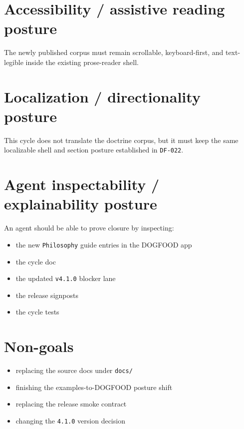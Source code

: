 \section{Accessibility / assistive reading posture}\label{record-085-accessibility-assistive-reading-posture}

The newly published corpus must remain scrollable, keyboard-first, and text-legible inside the existing prose-reader shell.

\section{Localization / directionality posture}\label{record-085-localization-directionality-posture}

This cycle does not translate the doctrine corpus, but it must keep the same localizable shell and section posture established in \texttt{D\allowbreak{}F\allowbreak{}-\allowbreak{}0\allowbreak{}2\allowbreak{}2}.

\section{Agent inspectability / explainability posture}\label{record-085-agent-inspectability-explainability-posture}

An agent should be able to prove closure by inspecting:

\begin{itemize}
\tightlist
\item
  the new \texttt{P\allowbreak{}h\allowbreak{}i\allowbreak{}l\allowbreak{}o\allowbreak{}s\allowbreak{}o\allowbreak{}p\allowbreak{}h\allowbreak{}y} guide entries in the DOGFOOD app
\item
  the cycle doc
\item
  the updated \texttt{v\allowbreak{}4\allowbreak{}.\allowbreak{}1\allowbreak{}.\allowbreak{}0} blocker lane
\item
  the release signposts
\item
  the cycle tests
\end{itemize}

\section{Non-goals}\label{record-085-non-goals}

\begin{itemize}
\tightlist
\item
  replacing the source docs under \texttt{d\allowbreak{}o\allowbreak{}c\allowbreak{}s\allowbreak{}/}
\item
  finishing the examples-to-DOGFOOD posture shift
\item
  replacing the release smoke contract
\item
  changing the \texttt{4\allowbreak{}.\allowbreak{}1\allowbreak{}.\allowbreak{}0} version decision
\end{itemize}

